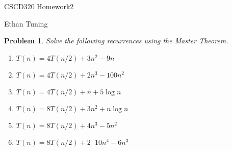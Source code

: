 \documentclass[11pt]{article}
\newtheorem{problem}{Problem}
\begin{document}
	
\begin{center}
{\LARGE CSCD320 Homework2}
		
\bigskip
		
{\Large Ethan Tuning}
\end{center}
	
\bigskip
	
\begin{problem}
 \label{prob:1}
  Solve the following recurrences using the Master Theorem.
  \begin{enumerate}
  	\item$T(n) = 4T(n/2) + 3n^2 - 9n$
  	\item$T(n) = 4T(n/2) + 2n^3 - 100n^2$
  	\item$T(n) = 4T(n/2) + n + 5\log{n}$
  	\item$T(n) = 8T(n/2) + 3n^2 + n\log{n}$
  	\item$T(n) = 8T(n/2) + 4n^3 - 5n^2$
  	\item$T(n) = 8T(n/2) + 2^-10n^4 - 6n^3$
  \end{enumerate}
\end{problem}
\end{document}
